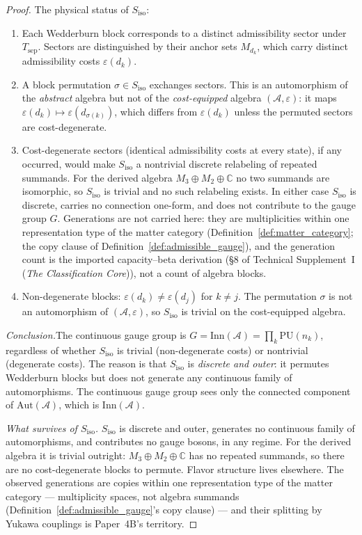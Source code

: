 \documentclass[11pt]{article}
\theoremstyle{definition}
\newcommand{\eps}{\varepsilon}
\newcommand{\TSI}{Technical Supplement~I (\emph{The Classification Core})}
\begin{document}
\begin{proof}
The physical status of $S_{\mathrm{iso}}$:
\begin{enumerate}[label=(\alph*),nosep]
  \item Each Wedderburn block corresponds to a distinct admissibility sector
  under $T_{\mathrm{sep}}$.  Sectors are distinguished by their anchor sets
  $M_{d_k}$, which carry distinct admissibility costs $\eps(d_k)$.
  \item A block permutation $\sigma \in S_{\mathrm{iso}}$ exchanges sectors.
  This is an automorphism of the \emph{abstract} algebra but not of the
  \emph{cost-equipped} algebra $(\mathcal{A}, \eps)$: it maps
  $\eps(d_k) \mapsto \eps(d_{\sigma(k)})$, which differs from $\eps(d_k)$
  unless the permuted sectors are cost-degenerate.
  \item Cost-degenerate sectors (identical admissibility costs at every
  state), if any occurred, would make $S_{\mathrm{iso}}$ a nontrivial
  discrete relabeling of repeated summands.  For the derived algebra
  $M_3 \oplus M_2 \oplus \mathbb{C}$ no two summands are isomorphic, so
  $S_{\mathrm{iso}}$ is trivial and no such relabeling exists.  In
  either case $S_{\mathrm{iso}}$ is discrete, carries no connection
  one-form, and does not contribute to the gauge group $G$.
  Generations are not carried here: they are multiplicities within one
  representation type of the matter category
  (Definition~\ref{def:matter_category}; the copy clause of
  Definition~\ref{def:admissible_gauge}), and the generation count is
  the imported capacity--beta derivation
  (\S8 of \TSI{}), not a count of algebra
  blocks.
  \item Non-degenerate blocks: $\eps(d_k) \ne \eps(d_j)$ for $k \ne j$.
  The permutation $\sigma$ is not an automorphism of $(\mathcal{A}, \eps)$,
  so $S_{\mathrm{iso}}$ is trivial on the cost-equipped algebra.
\end{enumerate}

\noindent\textit{Conclusion.}\quad The continuous gauge group is
$G = \mathrm{Inn}(\mathcal{A}) = \prod_k \mathrm{PU}(n_k)$,
regardless of whether $S_{\mathrm{iso}}$ is trivial (non-degenerate
costs) or nontrivial (degenerate costs).  The reason is that
$S_{\mathrm{iso}}$ is \emph{discrete and outer}: it permutes
Wedderburn blocks but does not generate any continuous family of
automorphisms.  The continuous gauge group sees only the connected
component of $\mathrm{Aut}(\mathcal{A})$, which is
$\mathrm{Inn}(\mathcal{A})$.

\smallskip\noindent\textit{What survives of $S_{\mathrm{iso}}$.}\quad
$S_{\mathrm{iso}}$ is discrete and outer, generates no continuous
family of automorphisms, and contributes no gauge bosons, in any
regime.  For the derived algebra it is trivial outright:
$M_3 \oplus M_2 \oplus \mathbb{C}$ has no repeated summands, so there
are no cost-degenerate blocks to permute.  Flavor structure lives
elsewhere.  The observed generations are copies within one
representation type of the matter category --- multiplicity spaces,
not algebra summands (Definition~\ref{def:admissible_gauge}'s copy
clause) --- and their splitting by Yukawa couplings is Paper~4B's
territory.


\end{proof}
\end{document}
